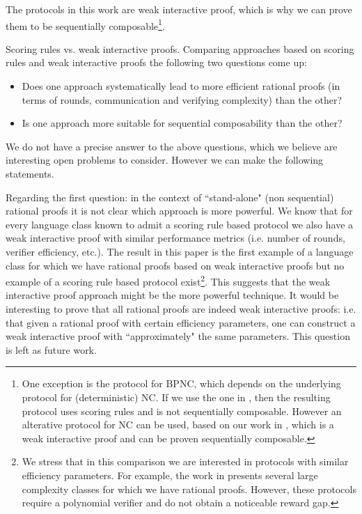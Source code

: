 The protocols in this work are weak interactive proof, which is why we can prove them to be sequentially composable\footnote{
	One exception is the protocol for BPNC, which depends on the underlying protocol for (deterministic) NC. If we use the one in \cite{ratsumchecks}, then the resulting protocol uses scoring rules and is not sequentially composable. However an alterative protocol for NC can be used, based on our work in \cite{cg15}, which is a weak interactive proof and can be proven sequentially composable.}.


\medskip
\noindent
{\sc Scoring rules vs. weak interactive proofs.}
Comparing approaches based on scoring rules and weak interactive proofs the following two questions come up: 
\begin{itemize}
	\item Does one approach systematically lead to more efficient rational proofs (in terms of rounds, communication and verifying complexity) than the other? 
	\item Is one approach more suitable for sequential composability than the other?
\end{itemize}
We do not have a precise answer to the above questions, which we believe are interesting open problems to consider. However we can make the following statements. 

Regarding the first question: in the context of ``stand-alone" (non sequential) rational proofs it is not clear which approach is more powerful. We know that for every language class known to admit a scoring rule based protocol we also have a weak interactive proof with similar performance metrics (i.e. number of rounds, verifier efficiency, etc.). The result in this paper is the first example of a language class for which we have rational proofs based on weak interactive proofs but no example of a scoring rule based protocol exist\footnote{
	We stress that in this comparison we are interested in protocols with similar efficiency parameters. For example, the work in \cite{am} presents several large complexity classes for which we have rational proofs. However, these protocols require a polynomial verifier and do not obtain a noticeable reward gap.}.
This suggests that the weak interactive proof approach might be the more powerful technique. It would be interesting to prove that all rational proofs are indeed weak interactive proofs: i.e. that given a rational proof with certain efficiency parameters, one can construct a weak interactive proof with ``approximately" the same parameters. This question is left as future work.


